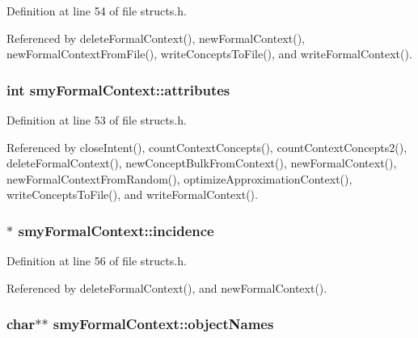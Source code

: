\-Definition at line 54 of file structs.\-h.



\-Referenced by delete\-Formal\-Context(), new\-Formal\-Context(), new\-Formal\-Context\-From\-File(), write\-Concepts\-To\-File(), and write\-Formal\-Context().

\hypertarget{structsmyFormalContext_a4ae89e8f42fd7feab4db872cd8472b5e}{
\subsubsection[{attributes}]{\setlength{\rightskip}{0pt plus 5cm}int {\bf smy\-Formal\-Context\-::attributes}}}\label{structsmyFormalContext_a4ae89e8f42fd7feab4db872cd8472b5e}


\-Definition at line 53 of file structs.\-h.



\-Referenced by close\-Intent(), count\-Context\-Concepts(), count\-Context\-Concepts2(), delete\-Formal\-Context(), new\-Concept\-Bulk\-From\-Context(), new\-Formal\-Context(), new\-Formal\-Context\-From\-Random(), optimize\-Approximation\-Context(), write\-Concepts\-To\-File(), and write\-Formal\-Context().

\hypertarget{structsmyFormalContext_a55d9d4c2e38c3571e9f6e870bc1c06b8}{
\subsubsection[{incidence}]{$\ast$ {\bf smy\-Formal\-Context\-::incidence}}}\label{structsmyFormalContext_a55d9d4c2e38c3571e9f6e870bc1c06b8}


\-Definition at line 56 of file structs.\-h.



\-Referenced by delete\-Formal\-Context(), and new\-Formal\-Context().

\hypertarget{structsmyFormalContext_a732a2615921f2d209fb7d9341df2c183}{
\subsubsection[{object\-Names}]{\setlength{\rightskip}{0pt plus 5cm}char$\ast$$\ast$ {\bf smy\-Formal\-Context\-::object\-Names}}}\label{structsmyFormalContext_a732a2615921f2d209fb7d9341df2c183}


